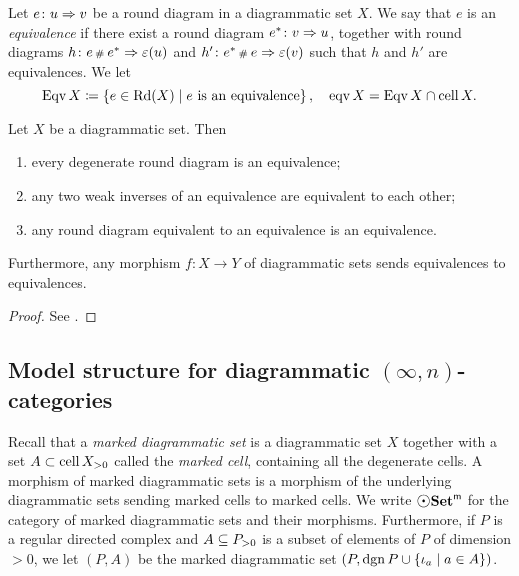 \begin{dfn} [Equivalence] 
    Let \( e \colon u \celto v \) be a round diagram in a diagrammatic set \( X \).
    We say that \( e \) is an \emph{equivalence} if there exist a round diagram \( e^* \colon v \celto u \), together with round diagrams \( h \colon e \cp{} e^* \celto \un(u) \) and \( h' \colon e^* \cp{} e \celto \un(v) \) such that \( h \) and \( h' \) are equivalences.
    We let
    \begin{equation*}
        \Eqv X \eqdef \set{e \in \Rd(X) \mid e \text{ is an equivalence}},\quad \eqv X = \Eqv X \cap \cell X.
    \end{equation*}
\end{dfn}

\begin{prop} \label{prop:main_equivalence}
    Let \( X \) be a diagrammatic set.
    Then
    \begin{enumerate}
        \item every degenerate round diagram is an equivalence;
        \item any two weak inverses of an equivalence are equivalent to each other;
        \item any round diagram equivalent to an equivalence is an equivalence.
    \end{enumerate}
    Furthermore, any morphism \( f \colon X \to Y \) of diagrammatic sets sends equivalences to equivalences.
\end{prop}
\begin{proof}
    See \cite[Theorem 2.13, Proposition 2.19, Corollary 2.29, Proposition 2.31]{chanavat2024equivalences}.
\end{proof}

\subsection{Model structure for diagrammatic \texorpdfstring{$(\infty, n)$}{(∞, n)}-categories}


Recall that a \emph{marked diagrammatic set} is a diagrammatic set \( X \) together with a set \( A \subset \gr{> 0}{\cell X} \) called the \emph{marked cell}, containing all the degenerate cells. 
A morphism of marked diagrammatic sets is a morphism of the underlying diagrammatic sets sending marked cells to marked cells.
We write \( \mdgmSet \) for the category of marked diagrammatic sets and their morphisms. 
Furthermore, if \( P \) is a regular directed complex and \( A \subseteq \gr{> 0}{P} \) is a subset of elements of \( P \) of dimension \( > 0 \), we let \( (P, A) \) be the marked diagrammatic set \( (P, \dgn P \cup \set{\mapel{a} \mid a \in A}) \).

